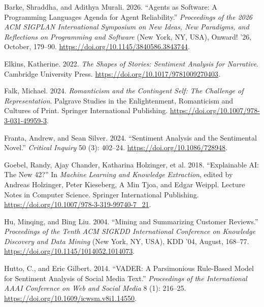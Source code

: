 \documentclass[
  letterpaper,
  DIV=11,
  numbers=noendperiod]{scrartcl}
\newlength{\cslhangindent}
\newenvironment{CSLReferences}[2] %
 {\begin{list}{}{%
  \setlength{\itemindent}{0pt}
  \setlength{\leftmargin}{0pt}
  \setlength{\parsep}{0pt}
  \ifodd #1
   \setlength{\leftmargin}{\cslhangindent}
   \setlength{\itemindent}{-1\cslhangindent}
  \fi
  \setlength{\itemsep}{#2\baselineskip}}}
 {\end{list}}
\begin{document}
\protect{}\label{refs}
\begin{CSLReferences}{1}{1}
Barke, Shraddha, and Adithya Murali. 2026. {``Agents as {Software}: {A}
{Programming} {Languages} {Agenda} for {Agent} {Reliability}.''}
\emph{Proceedings of the 2026 {ACM} {SIGPLAN} {International}
{Symposium} on {New} {Ideas}, {New} {Paradigms}, and {Reflections} on
{Programming} and {Software}} (New York, NY, USA), Onward! '26, October,
179--90. \url{https://doi.org/10.1145/3840586.3843744}.

Elkins, Katherine. 2022. \emph{The {Shapes} of {Stories}: {Sentiment}
{Analysis} for {Narrative}}. Cambridge University Press.
\url{https://doi.org/10.1017/9781009270403}.

Falk, Michael. 2024. \emph{Romanticism and the {Contingent} {Self}:
{The} {Challenge} of {Representation}}. Palgrave {Studies} in the
{Enlightenment}, {Romanticism} and {Cultures} of {Print}. Springer
International Publishing.
\url{https://doi.org/10.1007/978-3-031-49959-3}.

Franta, Andrew, and Sean Silver. 2024. {``Sentiment {Analysis} and the
{Sentimental} {Novel}.''} \emph{Critical Inquiry} 50 (3): 402--24.
\url{https://doi.org/10.1086/728948}.

Goebel, Randy, Ajay Chander, Katharina Holzinger, et al. 2018.
{``Explainable {AI}: {The} {New} 42?''} In \emph{Machine {Learning} and
{Knowledge} {Extraction}}, edited by Andreas Holzinger, Peter Kieseberg,
A Min Tjoa, and Edgar Weippl. Lecture {Notes} in {Computer} {Science}.
Springer International Publishing.
\url{https://doi.org/10.1007/978-3-319-99740-7_21}.

Hu, Minqing, and Bing Liu. 2004. {``Mining and Summarizing Customer
Reviews.''} \emph{Proceedings of the Tenth {ACM} {SIGKDD} International
Conference on {Knowledge} Discovery and Data Mining} (New York, NY,
USA), {KDD} '04, August, 168--77.
\url{https://doi.org/10.1145/1014052.1014073}.

Hutto, C., and Eric Gilbert. 2014. {``{VADER}: {A} {Parsimonious}
{Rule}-{Based} {Model} for {Sentiment} {Analysis} of {Social} {Media}
{Text}.''} \emph{Proceedings of the International AAAI Conference on Web
and Social Media} 8 (1): 216--25.
\url{https://doi.org/10.1609/icwsm.v8i1.14550}.


\end{CSLReferences}
\end{document}
